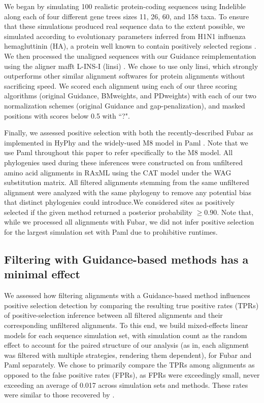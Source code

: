 \documentclass[10pt]{article}
\begin{document}
We began by simulating 100 realistic protein-coding sequences using Indelible \citep{Fletcher2009} along each of four different gene trees sizes 11, 26, 60, and 158 taxa. To ensure that these simulations produced real sequence data to the extent possible, we simulated according to evolutionary parameters inferred from H1N1 influenza hemagluttinin (HA), a protein well known to contain positively selected regions \citep{Meyer2012}. We then processed the unaligned sequences with our Guidance reimplementation using the aligner mafft L-INS-I (linsi) \citep{Katoh2005}. We chose to use only linsi, which strongly outperforms other similar alignment softwares for protein alignments \citep{Thompson2011,Nuin2006} without sacrificing speed. We scored each alignment using each of our three scoring algorithms (original Guidance, BMweights, and PDweights) with each of our two normalization schemes (original Guidance and gap-penalization), and masked positions with scores below 0.5 with ``?".

Finally, we assessed positive selection with both the recently-described Fubar \citep{Murrell2013} as implemented in HyPhy \citep{Pond2005} and the widely-used M8 model in Paml \citep{Yang2007}. Note that we use Paml throughout this paper to refer specifically to the M8 model.  All phylogenies used during these inferences were constructed on from unfiltered amino acid alignments in RAxML \citep{Stamatakis2006} using the CAT model under the WAG substitution matrix. All filtered alignments stemming from the same unfiltered alignment were analyzed with the same phylogeny to remove any potential bias that distinct phylogenies could introduce.We considered sites as positively selected if the given method returned a posterior probability $\geq0.90$. Note that, while we processed all alignments with Fubar, we did not infer positive selection for the largest simulation set with Paml due to prohibitive runtimes. 


\subsection*{Filtering with Guidance-based methods has a minimal effect}

We assessed how filtering alignments with a Guidance-based method influences positive selection detection by comparing the resulting true positive rates (TPRs) of positive-selection inference between all filtered alignments and their corresponding unfiltered alignments. To this end, we build mixed-effects linear models for each sequence simulation set, with simulation count as the random effect to account for the paired structure of our analysis (as in, each alignment was filtered with multiple strategies, rendering them dependent), for Fubar and Paml separately. We chose to primarily compare the TPRs among alignments as opposed to the false positive rates (FPRs), as FPRs were exceedingly small, never exceeding an average of 0.017 across simulation sets and methods. These rates were similar to those recovered by \citep{Jordan2011}. 
\end{document}
